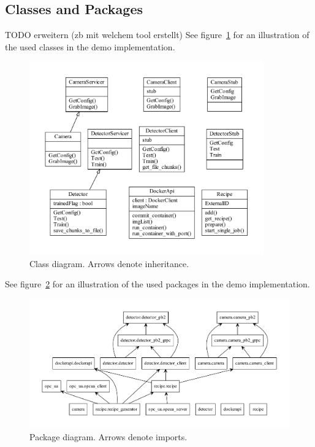 \subsection{Classes and Packages}
TODO erweitern (zb mit welchem tool erstellt)
See figure~\ref{fig:Classes} for an illustration of the used classes in the demo implementation.
\begin{figure}[ht]
	\centering
  \includegraphics[width=0.9\textwidth]{img/classes.pdf}
	\caption[Class diagram]{Class diagram. Arrows denote inheritance.}
	\label{fig:Classes}
\end{figure}

See figure~\ref{fig:Packages} for an illustration of the used packages in the demo implementation.
\begin{figure}[ht]
	\centering
  \includegraphics[width=\textwidth]{img/packages.pdf}
	\caption[Package diagram]{Package diagram. Arrows denote imports.}
	\label{fig:Packages}
\end{figure}

